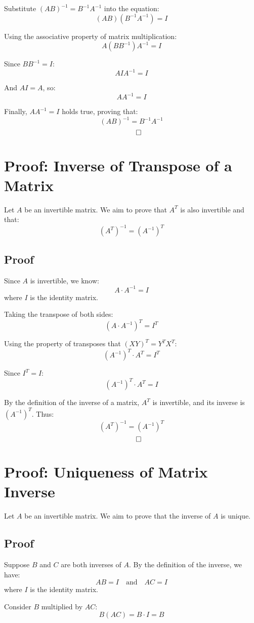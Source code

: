 \documentclass{article}
\begin{document}
Substitute \( (AB)^{-1} = B^{-1}A^{-1} \) into the equation:
\[
(AB)(B^{-1}A^{-1}) = I
\]

Using the associative property of matrix multiplication:
\[
A(BB^{-1})A^{-1} = I
\]

Since \( BB^{-1} = I \):
\[
AIA^{-1} = I
\]

And \( AI = A \), so:
\[
AA^{-1} = I
\]

Finally, \( AA^{-1} = I \) holds true, proving that:
\[
(AB)^{-1} = B^{-1}A^{-1}
\]
\[
\qed
\]

\section{Proof: Inverse of Transpose of a Matrix}
Let \( A \) be an invertible matrix. We aim to prove that \( A^T \) is also invertible and that:
\[
(A^T)^{-1} = (A^{-1})^T
\]

\subsection*{Proof}
Since \( A \) is invertible, we know:
\[
A \cdot A^{-1} = I
\]
where \( I \) is the identity matrix.

Taking the transpose of both sides:
\[
(A \cdot A^{-1})^T = I^T
\]

Using the property of transposes that \( (XY)^T = Y^T X^T \):
\[
(A^{-1})^T \cdot A^T = I^T
\]

Since \( I^T = I \):
\[
(A^{-1})^T \cdot A^T = I
\]

By the definition of the inverse of a matrix, \( A^T \) is invertible, and its inverse is \( (A^{-1})^T \). Thus:
\[
(A^T)^{-1} = (A^{-1})^T
\]
\[
\qed
\]

\section{Proof: Uniqueness of Matrix Inverse}
Let \( A \) be an invertible matrix. We aim to prove that the inverse of \( A \) is unique.

\subsection*{Proof}
Suppose \( B \) and \( C \) are both inverses of \( A \). By the definition of the inverse, we have:
\[
AB = I \quad \text{and} \quad AC = I
\]
where \( I \) is the identity matrix.

Consider \( B \) multiplied by \( AC \):
\[
B(AC) = B \cdot I = B
\]
\end{document}
